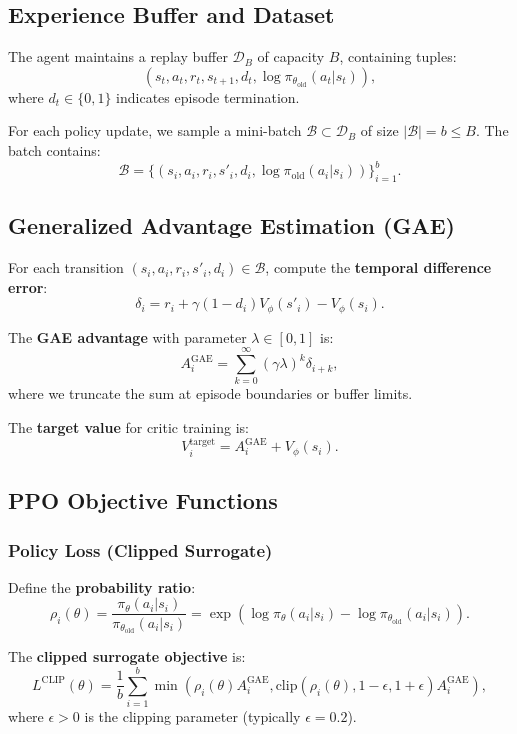 \documentclass[11pt]{article}
\begin{document}
\subsection{Experience Buffer and Dataset}
The agent maintains a replay buffer $\mathcal{D}_B$ of capacity $B$, containing tuples:
\[
(s_t, a_t, r_t, s_{t+1}, d_t, \log\pi_{\theta_{\text{old}}}(a_t|s_t)),
\]
where $d_t\in\{0,1\}$ indicates episode termination.

For each policy update, we sample a mini-batch $\mathcal{B} \subset \mathcal{D}_B$ of size $|\mathcal{B}| = b \le B$. The batch contains:
\[
\mathcal{B} = \{(s_i, a_i, r_i, s'_i, d_i, \log\pi_{\text{old}}(a_i|s_i))\}_{i=1}^{b}.
\]


\subsection{Generalized Advantage Estimation (GAE)}
For each transition $(s_i, a_i, r_i, s'_i, d_i) \in \mathcal{B}$, compute the \textbf{temporal difference error}:
\[
\delta_i = r_i + \gamma (1 - d_i) V_\phi(s'_i) - V_\phi(s_i).
\]

The \textbf{GAE advantage} with parameter $\lambda \in [0,1]$ is:
\[
A_i^{\text{GAE}} = \sum_{k=0}^{\infty} (\gamma \lambda)^k \delta_{i+k},
\]
where we truncate the sum at episode boundaries or buffer limits.

The \textbf{target value} for critic training is:
\[
V_i^{\text{target}} = A_i^{\text{GAE}} + V_\phi(s_i).
\]


\subsection{PPO Objective Functions}

\subsubsection{Policy Loss (Clipped Surrogate)}
Define the \textbf{probability ratio}:
\[
\rho_i(\theta) = \frac{\pi_\theta(a_i|s_i)}{\pi_{\theta_{\text{old}}}(a_i|s_i)} = \exp\left(\log\pi_\theta(a_i|s_i) - \log\pi_{\theta_{\text{old}}}(a_i|s_i)\right).
\]

The \textbf{clipped surrogate objective} is:
\[
L^{\text{CLIP}}(\theta) = \frac{1}{b} \sum_{i=1}^{b} \min\left( \rho_i(\theta) A_i^{\text{GAE}}, \text{clip}(\rho_i(\theta), 1-\epsilon, 1+\epsilon) A_i^{\text{GAE}} \right),
\]
where $\epsilon > 0$ is the clipping parameter (typically $\epsilon = 0.2$).
\end{document}
